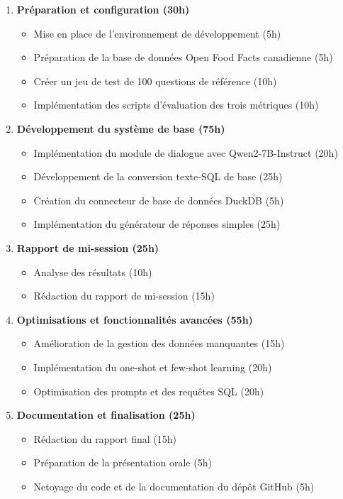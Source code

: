 \documentclass[a4paper,11pt]{article}
\begin{document}
\begin{enumerate}
    \item \textbf{Préparation et configuration (30h)}
    \begin{itemize}
        \item Mise en place de l'environnement de développement (5h)
        \item Préparation de la base de données Open Food Facts canadienne (5h)
        \item Créer un jeu de test de 100 questions de référence (10h)
        \item Implémentation des scripts d'évaluation des trois métriques (10h)
    \end{itemize}

    \item \textbf{Développement du système de base (75h)}
    \begin{itemize}
        \item Implémentation du module de dialogue avec Qwen2-7B-Instruct (20h)
        \item Développement de la conversion texte-SQL de base (25h)
        \item Création du connecteur de base de données DuckDB (5h)
        \item Implémentation du générateur de réponses simples (25h)
    \end{itemize}

    \item \textbf{Rapport de mi-session (25h)}
    \begin{itemize}
        \item Analyse des résultats (10h)
        \item Rédaction du rapport de mi-session (15h)
    \end{itemize}

    \item \textbf{Optimisations et fonctionnalités avancées (55h)}
    \begin{itemize}
        \item Amélioration de la gestion des données manquantes (15h)
        \item Implémentation du one-shot et few-shot learning (20h)
        \item Optimisation des prompts et des requêtes SQL (20h)
    \end{itemize}

    \item \textbf{Documentation et finalisation (25h)}
    \begin{itemize}
        \item Rédaction du rapport final (15h)
        \item Préparation de la présentation orale (5h)
        \item Netoyage du code et de la documentation du dépôt GitHub (5h)
    \end{itemize}
\end{enumerate}
\end{document}
